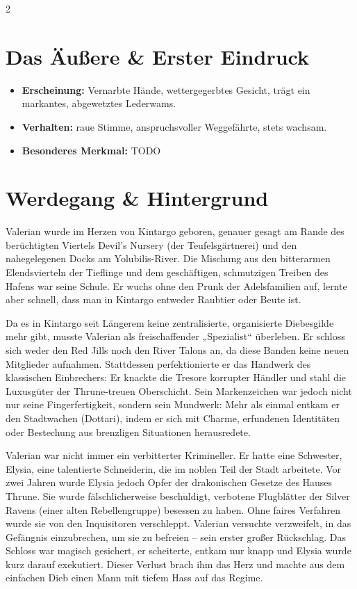 \documentclass[10pt,a4paper]{article}
\begin{document}
\begin{multicols}{2}

\section{Das Äußere \& Erster Eindruck}
\begin{itemize}
    \item \textbf{Erscheinung:} Vernarbte Hände, wettergegerbtes Gesicht, trägt ein markantes, abgewetztes Lederwams.
    \item \textbf{Verhalten:} raue Stimme, anspruchsvoller Weggefährte, stets wachsam.
    \item \textbf{Besonderes Merkmal:} TODO
\end{itemize}

\section{Werdegang \& Hintergrund}
Valerian wurde im Herzen von Kintargo geboren, genauer gesagt am Rande des berüchtigten Viertels Devil’s Nursery (der Teufelsgärtnerei) und den nahegelegenen Docks am Yolubilis-River. Die Mischung aus den bitterarmen Elendsvierteln der Tieflinge und dem geschäftigen, schmutzigen Treiben des Hafens war seine Schule. Er wuchs ohne den Prunk der Adelsfamilien auf, lernte aber schnell, dass man in Kintargo entweder Raubtier oder Beute ist.

Da es in Kintargo seit Längerem keine zentralisierte, organisierte Diebesgilde mehr gibt, musste Valerian als freischaffender „Spezialist“ überleben. Er schloss sich weder den Red Jills noch den River Talons an, da diese Banden keine neuen Mitglieder aufnahmen. Stattdessen perfektionierte er das Handwerk des klassischen Einbrechers: Er knackte die Tresore korrupter Händler und stahl die Luxusgüter der Thrune-treuen Oberschicht.
Sein Markenzeichen war jedoch nicht nur seine Fingerfertigkeit, sondern sein Mundwerk: Mehr als einmal entkam er den Stadtwachen (Dottari), indem er sich mit Charme, erfundenen Identitäten oder Bestechung aus brenzligen Situationen herausredete.

Valerian war nicht immer ein verbitterter Krimineller. Er hatte eine Schwester, Elysia, eine talentierte Schneiderin, die im noblen Teil der Stadt arbeitete. Vor zwei Jahren wurde Elysia jedoch Opfer der drakonischen Gesetze des Hauses Thrune. Sie wurde fälschlicherweise beschuldigt, verbotene Flugblätter der Silver Ravens (einer alten Rebellengruppe) besessen zu haben. Ohne faires Verfahren wurde sie von den Inquisitoren verschleppt. Valerian versuchte verzweifelt, in das Gefängnis einzubrechen, um sie zu befreien – sein erster großer Rückschlag. Das Schloss war magisch gesichert, er scheiterte, entkam nur knapp und Elysia wurde kurz darauf exekutiert. Dieser Verlust brach ihm das Herz und machte aus dem einfachen Dieb einen Mann mit tiefem Hass auf das Regime.


\end{multicols}
\end{document}
